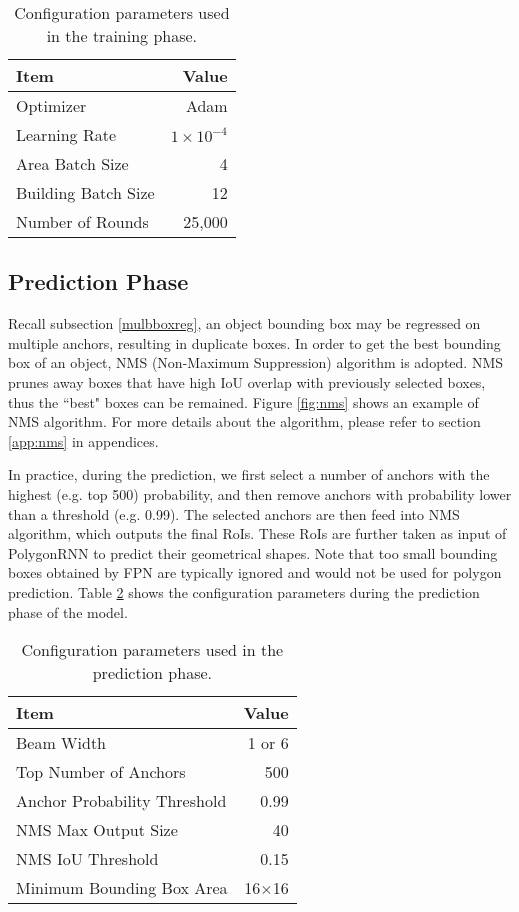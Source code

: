 \begin{table}[!h]
	\centering
	\caption[Configuration parameters used in the training phase]{Configuration parameters used in the training phase.}
	\label{tab:trnphs}
	\begin{tabular}{l|r}
	\hline
	\textbf{Item} & \textbf{Value} \\
	\hline
	Optimizer & Adam \\
	Learning Rate & $1\times10^{-4}$ \\
	Area Batch Size & 4 \\
	Building Batch Size & 12 \\
	Number of Rounds & 25,000 \\
	\hline
	\end{tabular}
\end{table}

\subsection{Prediction Phase}\label{prdphs}
Recall subsection \ref{mulbboxreg}, an object bounding box may be regressed on multiple anchors, resulting in duplicate boxes. In order to get the best bounding box of an object, NMS (Non-Maximum Suppression) algorithm is adopted. NMS prunes away boxes that have high IoU overlap with previously selected boxes, thus the ``best" boxes can be remained. Figure \ref{fig:nms} shows an example of NMS algorithm. For more details about the algorithm, please refer to section \ref{app:nms} in appendices.


In practice, during the prediction, we first select a number of anchors with the highest (e.g. top 500) probability, and then remove anchors with probability lower than a threshold (e.g. 0.99). The selected anchors are then feed into NMS algorithm, which outputs the final RoIs. These RoIs are further taken as input of PolygonRNN to predict their geometrical shapes. Note that too small bounding boxes obtained by FPN are typically ignored and would not be used for polygon prediction. Table \ref{tab:prdphs} shows the configuration parameters during the prediction phase of the model.
\begin{table}[!h]
	\centering
	\caption[Configuration parameters used in the prediction phase]{Configuration parameters used in the prediction phase.}
	\label{tab:prdphs}
	\begin{tabular}{l|r}
	\hline
	\textbf{Item} & \textbf{Value} \\
	\hline
	Beam Width & 1 or 6 \\
	Top Number of Anchors & 500 \\
	Anchor Probability Threshold & 0.99 \\
	NMS Max Output Size & 40 \\
	NMS IoU Threshold & 0.15 \\
	Minimum Bounding Box Area & 16$\times$16 \\
	\hline
	\end{tabular}
\end{table}

